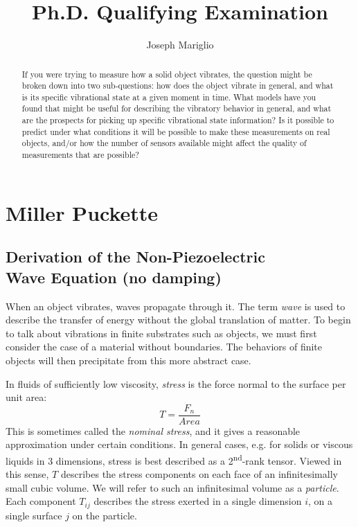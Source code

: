 \documentclass[a4paper,10pt]{report}
\title{Ph.D. Qualifying Examination}
\author{Joseph Mariglio}
\numberwithin{equation}{section}
\begin{document}
\maketitle

\chapter{Miller Puckette}
\begin{abstract}
If you were trying to measure how a solid object vibrates, the question might be broken down into two sub-questions: how does the object vibrate in general, and what is its specific vibrational state at a given moment in time. What models have you found that might be useful for describing the vibratory behavior in general, and what are the prospects for picking up specific vibrational state information? Is it possible to predict under what conditions it will be possible to make these measurements on real objects, and/or how the number of sensors available might affect the quality of measurements that are possible?
\end{abstract}
\section{Derivation of the Non-Piezoelectric \\ Wave Equation (no damping)}\label{sec:npwaveq_nd}

When an object vibrates, waves propagate through it. The term \emph{wave} is used to describe the transfer of energy without the global translation of matter. To begin to talk about vibrations in finite substrates such as objects, we must first consider the case of a material without boundaries. The behaviors of finite objects will then precipitate from this more abstract case.

In fluids of sufficiently low viscosity, \emph{stress} is the force normal to the surface per unit area:
\begin{equation}\label{stressnorm}
T = \frac{F_n}{Area}
\end{equation}
This is sometimes called the \emph{nominal stress}, and it gives a reasonable
approximation under certain conditions.
In general cases, e.g. for solids or viscous liquids in 3 dimensions, stress is best described as a 2\textsuperscript{nd}-rank tensor. Viewed in this sense, $T$ 
describes the stress components on each face of an infinitesimally small cubic
volume. We will refer to such an infinitesimal volume as a \emph{particle}. Each component $T_{ij}$ describes the stress exerted in a single dimension $i$, on a single surface $j$ on the particle. \cite{Ballantine1997, Kino1987}
\end{document}
